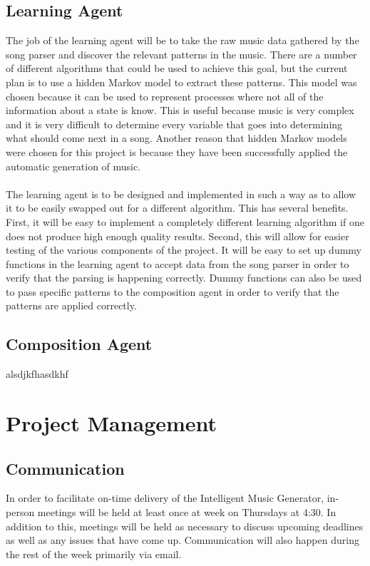 \documentclass{article}
\begin{document}
\subsection{Learning Agent}
The job of the learning agent will be to take the raw music data gathered by the song parser and discover the relevant patterns in the music. There are a number of different algorithms that could be used to achieve this goal, but the current plan is to use a hidden Markov model to extract these patterns. This model was chosen because it can be used to represent processes where not all of the information about a state is know. This is useful because music is very complex and it is very difficult to determine every variable that goes into determining what should come next in a song. Another reason that hidden Markov models were chosen for this project is because they have been successfully applied the automatic generation of music.\\
\\
The learning agent is to be designed and implemented in such a way as to allow it to be easily swapped out for a different algorithm. This has several benefits. First, it will be easy to implement a completely different learning algorithm if one does not produce high enough quality results. Second, this will allow for easier testing of the various components of the project. It will be easy to set up dummy functions in the learning agent to accept data from the song parser in order to verify that the parsing is happening correctly. Dummy functions can also be used to pass specific patterns to the composition agent in order to verify that the patterns are applied correctly.

\subsection{Composition Agent}
alsdjkfhasdkhf

\section{Project Management}
\subsection{Communication}
In order to facilitate on-time delivery of the Intelligent Music Generator, in-person meetings will be held at least once at week on Thursdays at 4:30. In addition to this, meetings will be held as necessary to discuss upcoming deadlines as well as any issues that have come up. Communication will also happen during the rest of the week primarily via email.
\end{document}
